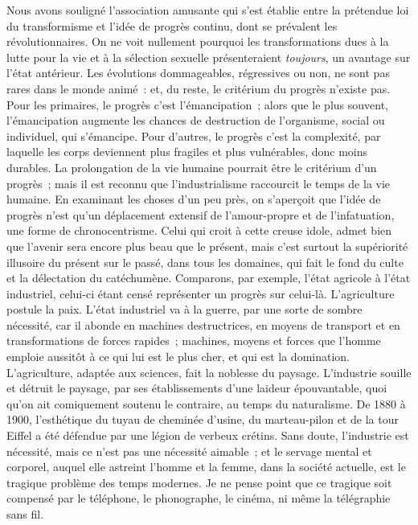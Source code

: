 \documentclass[french,twoside]{book} %
\begin{document}
Nous avons souligné l’association amusante qui s’est établie entre la prétendue loi du transformisme et l’idée de progrès continu, dont se prévalent les révolutionnaires. On ne voit nullement pourquoi les transformations dues à la lutte pour la vie et à la sélection sexuelle présenteraient {\itshape toujours}, un avantage sur l’état antérieur. Les évolutions dommageables, régressives ou non, ne sont pas rares dans le monde animé : et, du reste, le critérium du progrès n’existe pas. Pour les primaires, le progrès c’est l’émancipation ; alors que le plus souvent, l’émancipation augmente les chances de destruction de l’organisme, social ou individuel, qui s’émancipe. Pour d’autres, le progrès c’est la complexité, par laquelle les corps deviennent plus fragiles et plus vulnérables, donc moins durables. La prolongation de la vie humaine pourrait être le critérium d’un progrès ; mais il est reconnu que l’industrialisme raccourcit le temps de la vie humaine. En examinant les choses d’un peu près, on s’aperçoit que l’idée de progrès n’est qu’un déplacement extensif de l’amour-propre et de l’infatuation, une forme de chronocentrisme. Celui qui croit à cette creuse idole, admet bien que l’avenir sera encore plus beau que le présent, mais c’est surtout la supériorité illusoire du présent sur le passé, dans tous les domaines, qui fait le fond du culte et la délectation du catéchumène. Comparons, par exemple, l’état agricole à l’état industriel, celui-ci étant censé représenter un progrès sur celui-là. L’agriculture postule la paix. L’état industriel va à la guerre, par une sorte de sombre nécessité, car il abonde en machines destructrices, en moyens de transport et en transformations de forces rapides ; machines, moyens et forces que l’homme emploie aussitôt à ce qui lui est le plus cher, et qui est la domination. L’agriculture, adaptée aux sciences, fait la noblesse du paysage. L’industrie souille et détruit le paysage, par ses établissements d’une laideur épouvantable, quoi qu’on ait comiquement soutenu le contraire, au temps du naturalisme. De 1880 à 1900, l’esthétique du tuyau de cheminée d’usine, du marteau-pilon et de la tour Eiffel a été défendue par une légion de verbeux crétins. Sans doute, l’industrie est nécessité, mais ce n’est pas une nécessité aimable ; et le servage mental et corporel, auquel elle astreint l’homme et la femme, dans la société actuelle, est le tragique problème des temps modernes. Je ne pense point que ce tragique soit compensé par le téléphone, le phonographe, le cinéma, ni même la télégraphie sans fil.\par
\end{document}
